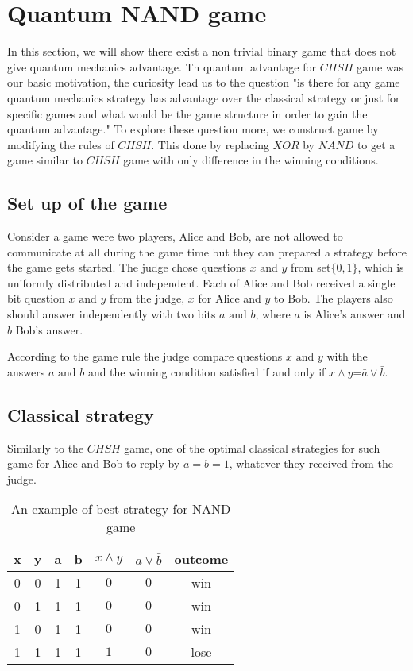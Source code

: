 \section{Quantum NAND game}
In this section, we will show there exist a non trivial binary game that does not give quantum mechanics advantage.
Th quantum advantage for $CHSH$ game was our basic motivation, the curiosity lead us to the question "is there for any game quantum mechanics strategy  has advantage over the classical strategy or just for specific games and what would be the game structure in order to gain the quantum advantage." To explore these question more, we construct game by modifying the rules of $CHSH$. This done by replacing $XOR$ by $NAND$ to get a game similar to $CHSH$ game with only difference in the winning conditions. 
\subsection{Set up of the game} \hfill \break
Consider a game were two players, Alice and Bob, are not allowed to  communicate
at all during the game time but they can prepared a strategy  before the game gets started\citep*{ANDJIGA1988189}. The judge chose questions $x  \text{ and } y$  from  set$\{0,1\}$, which is uniformly  distributed and independent. Each of Alice and Bob received a single bit  question $x \text{ and } y$ from  the judge, $x$ for Alice and $y$ to Bob. The players also  should answer independently with two bits $a \text{ and }  b$, where $a$  is Alice's answer and $b$ Bob's answer. 

According to the game rule the judge compare questions $x\text{ and } y$ with the answers $a \text{ and }  b$ and the winning condition satisfied if and only if $x \wedge y$=$\bar{a}\vee\bar{b}$.
\subsection{Classical strategy}\hfill \break
Similarly to the $CHSH$ game, one of the optimal classical strategies for such game for Alice and Bob to reply by $a=b=1$, whatever they received  from the judge.

\begin {table}[htp]
\begin{center}
\begin{tabular}{ |c|c|c|c|c |c|c| }
  \hline
  x & y & a & b &  $x \wedge y $ & $\bar{a}\vee\bar{b}$& outcome\\
  \hline 
  0 & 0 & 1 & 1 &$0$  & $0$& win\\
  \hline
  0 &1 & 1 & 1 &$0$  & $0$& win\\
  \hline
   1 & 0 & 1 & 1 &$0$ &  $0$  & win\\
  \hline
  1 & 1 & 1 & 1 &$1$  & $0$ & lose\\
  \hline
\end{tabular}
\caption {An example of best strategy for NAND game}
\end{center}
\end{table}

